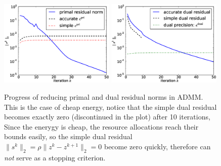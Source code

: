 \begin{figure}[th]
\centering
\includegraphics[width=0.49\textwidth]{figures/test_primal_c.eps}
\includegraphics[width=0.49\textwidth]{figures/test_dual_c.eps}
\caption{Progress of reducing primal and dual residual norms in ADMM.
    This is the case of cheap energy, notice that the simple dual
residual becomes exactly zero (discontinued in the plot) after 10 iterations, 
Since the enerygy is cheap, the resource allocations reach their bounds easily,
so the simple dual residual $\|s^k\|_2=\rho\|z^{k}-z^{k+1}\|_2=0$ 
become zero quickly, therefore can \emph{not} serve as a stopping criterion.}
\label{fig:residual-c}
\end{figure}

